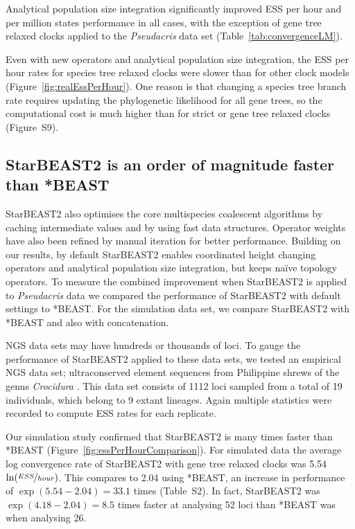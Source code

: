 \documentclass[12pt]{article}
\begin{document}
Analytical population size integration significantly improved ESS per hour and
per million states performance in all cases, with the exception of gene tree
relaxed clocks applied to the \textit{Pseudacris} data set
(Table~\ref{tab:convergenceLM}).

Even with new operators and analytical population size integration, the ESS
per hour rates for species tree relaxed clocks were slower than for other
clock models (Figure~\ref{fig:realEssPerHour}). One reason is that changing a
species tree branch rate requires updating the phylogenetic likelihood for all
gene trees, so the computational cost is much higher than for strict or gene
tree relaxed clocks (Figure~S9).

\subsection{StarBEAST2 is an order of magnitude faster than *BEAST}

StarBEAST2 also optimises the core multispecies coalescent algorithms by
caching intermediate values and by using fast data structures. Operator
weights have also been refined by manual iteration for better performance.
Building on our results, by default StarBEAST2 enables coordinated height
changing operators and analytical population size integration, but keeps
na\"ive topology operators. To measure the combined improvement when
StarBEAST2 is applied to \textit{Pseudacris} data we compared the performance
of StarBEAST2 with default settings to *BEAST. For the simulation data set, we
compare StarBEAST2 with *BEAST and also with concatenation.

NGS data sets may have hundreds or thousands of loci. To gauge the performance
of StarBEAST2 applied to these data sets, we tested an empirical NGS data set;
ultraconserved element \citep[UCE;][]{Faircloth01102012} sequences from
Philippine shrews of the genus \textit{Crocidura} \citep{Giarla01092015}. This
data set consists of 1112 loci sampled from a total of 19 individuals, which
belong to 9 extant lineages. Again multiple statistics were recorded to
compute ESS rates for each replicate.

Our simulation study confirmed that StarBEAST2 is many times faster than
*BEAST (Figure~\ref{fig:essPerHourComparison}). For simulated data the average
log convergence rate of StarBEAST2 with gene tree relaxed clocks was 5.54
$\ln(\nicefrac{ESS}{hour})$. This compares to 2.04 using *BEAST, an
increase in performance of $\exp(5.54 - 2.04) = 33.1$ times (Table~S2). In
fact, StarBEAST2 was
$\exp(4.18 - 2.04) = 8.5$ times faster at analysing 52 loci than *BEAST
was when analysing 26.
\end{document}
